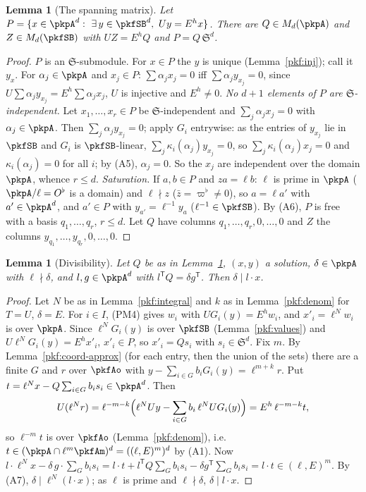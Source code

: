 \documentclass[10pt]{amsart}
\newtheorem{lemma}[theorem]{Lemma}
\theoremstyle{definition}
\theoremstyle{remark}
\begin{document}
\begin{lemma}[The spanning matrix]\label{pkf:span}
Let $P=\{x\in\pkpA^d:\ \exists\,y\in\pkfSB^d,\ Uy=E^hx\}$. There are $Q\in M_d(\pkpA)$ and $Z\in
M_d(\pkfSB)$ with $UZ=E^hQ$ and $P=Q\,\mathfrak S^d$.
\end{lemma}

\begin{proof}
$P$ is an $\mathfrak S$-submodule. For $x\in P$ the $y$ is unique (Lemma~\ref{pkf:inj}); call it $y_x$.
For $\alpha_j\in\pkpA$ and $x_j\in P$: $\sum\alpha_jx_j=0$ iff $\sum\alpha_jy_{x_j}=0$, since
$U\sum\alpha_jy_{x_j}=E^h\sum\alpha_jx_j$, $U$ is injective and $E^h\ne0$.
\emph{No $d+1$ elements of $P$ are $\mathfrak S$-independent.} Let $x_1,\dots,x_r\in P$ be
$\mathfrak S$-independent and $\sum_j\alpha_jx_j=0$ with $\alpha_j\in\pkpA$. Then $\sum_j\alpha_jy_{x_j}=0$;
apply $G_i$ entrywise: as the entries of $y_{x_j}$ lie in $\pkfSB$ and $G_i$ is $\pkfSB$-linear,
$\sum_j\kappa_i(\alpha_j)y_{x_j}=0$, so $\sum_j\kappa_i(\alpha_j)x_j=0$ and $\kappa_i(\alpha_j)=0$ for all
$i$; by (A5), $\alpha_j=0$. So the $x_j$ are independent over the domain $\pkpA$, whence $r\le d$.
\emph{Saturation.} If $a,b\in P$ and $za=\ell b$: $\ell$ is prime in $\pkpA$ ($\pkpA/\ell=O^\flat$ is a
domain) and $\ell\nmid z$ ($\bar z=\varpi^\flat\ne0$), so $a=\ell a'$ with $a'\in\pkpA^d$, and $a'\in P$
with $y_{a'}=\ell^{-1}y_a$ ($\ell^{-1}\in\pkfSB$). By (A6), $P$ is free with a basis
$q_1,\dots,q_r$, $r\le d$. Let $Q$ have columns $q_1,\dots,q_r,0,\dots,0$ and $Z$ the columns
$y_{q_1},\dots,y_{q_r},0,\dots,0$.
\end{proof}

\begin{lemma}[Divisibility]\label{pkf:dvd}
Let $Q$ be as in Lemma~\ref{pkf:span}, $(x,y)$ a solution, $\delta\in\pkpA$ with $\ell\nmid\delta$, and
$l,g\in\pkpA^d$ with $l^{\mathsf T}Q=\delta g^{\mathsf T}$. Then $\delta\mid l\cdot x$.
\end{lemma}

\begin{proof}
Let $N$ be as in Lemma~\ref{pkf:integral} and $k$ as in Lemma~\ref{pkf:denom} for $T=U$, $\delta=E$. For
$i\in I$, (PM4) gives $w_i$ with $UG_i(y)=E^hw_i$, and $x'_i=\ell^Nw_i$ is over $\pkpA$. Since
$\ell^NG_i(y)$ is over $\pkfSB$ (Lemma~\ref{pkf:values}) and $U\ell^NG_i(y)=E^hx'_i$, $x'_i\in P$, so
$x'_i=Qs_i$ with $s_i\in\mathfrak S^d$. Fix $m$. By Lemma~\ref{pkf:coord-approx} (for each entry, then
the union of the sets) there are a finite $G$ and $r$ over $\pkfAo$ with $y-\sum_{i\in G}b_iG_i(y)=
\ell^{m+k}r$. Put $t=\ell^Nx-Q\sum_{i\in G}b_is_i\in\pkpA^d$. Then
\[U(\ell^Nr)=\ell^{-m-k}\Bigl(\ell^NUy-\sum_{i\in G}b_i\,\ell^NUG_i(y)\Bigr)=E^h\,\ell^{-m-k}t,\]
so $\ell^{-m}t$ is over $\pkfAo$ (Lemma~\ref{pkf:denom}), i.e.\ $t\in(\pkpA\cap\ell^m\pkfAm)^d=
((\ell,E)^m)^d$ by (A1). Now $l\cdot\ell^Nx-\delta\,g\cdot\sum_Gb_is_i=l\cdot t+l^{\mathsf T}Q\sum_G
b_is_i-\delta g^{\mathsf T}\sum_Gb_is_i=l\cdot t\in(\ell,E)^m$. By (A7), $\delta\mid\ell^N(l\cdot x)$; as
$\ell$ is prime and $\ell\nmid\delta$, $\delta\mid l\cdot x$.
\end{proof}
\end{document}
